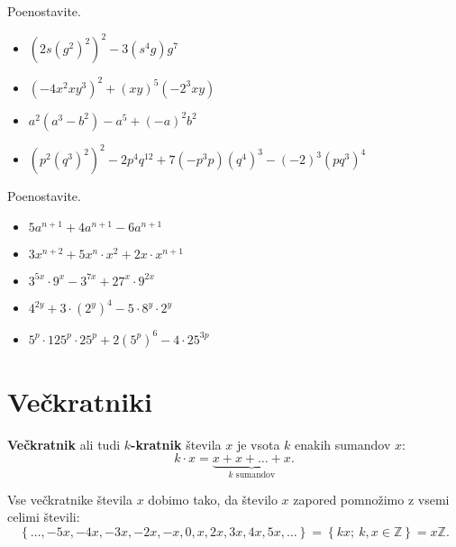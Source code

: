         \begin{naloga}
            Poenostavite.
            \begin{itemize}
                \item $(2s(g^2)^2)^2-3(s^4g)g^7$ 
                \item $(-4x^2xy^3)^2+(xy)^5(-2^3xy)$
                \item $a^2(a^3-b^2)-a^5+(-a)^2b^2$ 
                \item $(p^2(q^3)^2)^2-2p^4q^{12}+7(-p^3p)(q^4)^3-(-2)^3(pq^3)^4$ 
            \end{itemize}
        \end{naloga}

        \begin{naloga}
            Poenostavite.
            \begin{itemize}
                \item $5a^{n+1}+4a^{n+1}-6a^{n+1}$ 
                \item $3x^{n+2}+5x^n\cdot x^2+2x\cdot x^{n+1}$
                \item $3^{5x}\cdot 9^x-3^{7x}+27^x\cdot 9^{2x}$ 
                \item $4^{2y}+3\cdot(2^y)^4-5\cdot 8^y\cdot 2^y$ 
                \item $5^p\cdot 125^p\cdot 25^p+2(5^p)^6-4\cdot 25^{3p}$ 
            \end{itemize}
        \end{naloga}




\newpage
        \section{Večkratniki}

        
            
            
                \textbf{Večkratnik} ali tudi \textbf{$k$-kratnik} števila $x$ je vsota $k$ enakih sumandov $x$:
                    $${k\cdot x=\underbrace{x+x+\ldots+x}_\text{$k$ sumandov}}.$$
            
    
            
                Vse večkratnike števila $x$ dobimo tako, da število $x$ zapored pomnožimo z vsemi celimi števili:
                $$\left\{\ldots,-5x, -4x, -3x, -2x, -x, 0, x, 2x, 3x, 4x, 5x, \ldots\right\}=\left\{kx;\ k,x\in\mathbb{Z}\right\}=x\mathbb{Z}. $$
            
    
            
